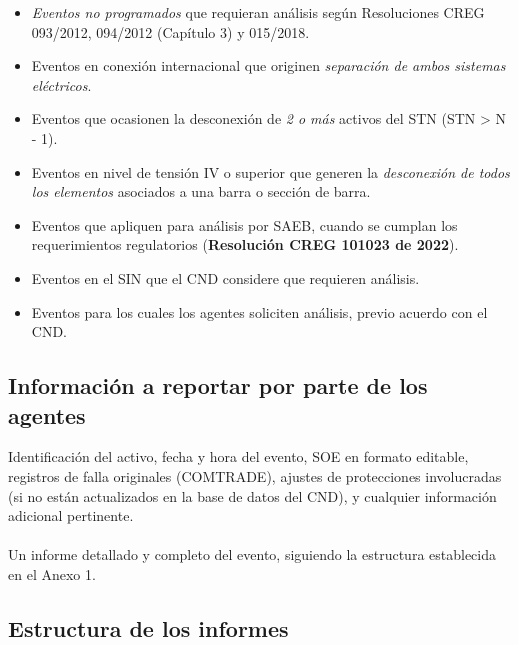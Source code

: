 \documentclass[a5paper]{book}%
\begin{document}
\begin{itemize}
\item\textit{ Eventos no programados} que requieran análisis según Resoluciones CREG 093/2012, 094/2012 (Capítulo 3) y 015/2018.
\item Eventos en conexión internacional que originen \textit{separación de ambos sistemas eléctricos}.
    
\item Eventos que ocasionen la desconexión de \textit{2 o más} activos del STN (STN > N - 1).
    
\item Eventos en nivel de tensión IV o superior que generen la \textit{desconexión de todos los elementos} asociados a una barra o sección de barra.
    
\item Eventos que apliquen para análisis por \ac{SAEB}, cuando se cumplan los requerimientos regulatorios (\textbf{Resolución CREG 101023 de 2022}).
    
\item Eventos en el SIN que el CND considere que requieren análisis.
    
\item Eventos para los cuales los agentes soliciten análisis, previo acuerdo con el CND.

\end{itemize}
    
\subsection{Información a reportar por parte de los agentes}

 Identificación del activo, fecha y hora del evento, \ac{SOE} en formato editable, registros de falla originales (COMTRADE), ajustes de protecciones involucradas (si no están actualizados en la base de datos del CND), y cualquier información adicional pertinente.\\\\
Un informe detallado y completo del evento, siguiendo la estructura establecida en el Anexo 1.

\subsection{Estructura de los informes}
\end{document}
